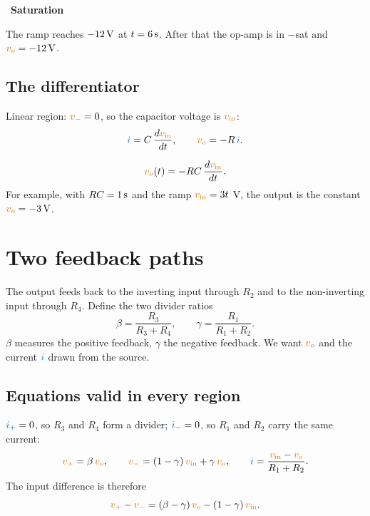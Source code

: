 \documentclass[11pt,a4paper]{article}
\newcommand{\Icol}[1]{\textcolor{ccur}{#1}}
\newcommand{\Vcol}[1]{\textcolor{cvolt}{#1}}
\newif\ifsolfirst
\newcommand{\solstep}[2]{\par\ifsolfirst\global\solfirstfalse\else\bigskip\needspace{5\baselineskip}\fi
  \noindent{\color{cpow}\bfseries Step #1.}\ {\bfseries #2}\par\nobreak\smallskip}
\newcommand{\vin}{\Vcol{v_{\mathrm{in}}}}
\newcommand{\vo}{\Vcol{v_o}}
\newcommand{\vp}{\Vcol{v_+}}
\newcommand{\vm}{\Vcol{v_-}}
\newcommand{\ip}{\Icol{i_+}}
\newcommand{\im}{\Icol{i_-}}
\newcommand{\intdiff}[1]{%
  \node[oa] (A) at (0,0) {};
  \ifnum#1=0
    \draw (A.-) -- ++(-0.4,0) coordinate (n) to[R, l_=$R$] ++(-2.0,0) coordinate (s);
    \draw (n) -- ++(0,1.3) coordinate (f) to[C, l_=$C$] (f -| A.out) -- (A.out);
    \node[pol] at ($(f)+(0.45,0.38)$) {$+$}; \node[pol] at ($(f -| A.out)+(-0.45,0.38)$) {$-$};
    \node[font=\small, text=cvolt] at ($(f)!0.5!(f -| A.out)+(0,0.45)$) {$v_C$};
    \draw[iar] ($(s)+(0.35,0.28)$) -- ++(0.5,0); \node[font=\small, text=ccur, above] at ($(s)+(0.6,0.28)$) {$i$};
  \else
    \draw (A.-) -- ++(-0.4,0) coordinate (n) to[C, l_=$C$] ++(-2.0,0) coordinate (s);
    \draw (n) -- ++(0,1.3) coordinate (f) to[R, l=$R$] (f -| A.out) -- (A.out);
    \node[pol] at ($(s)+(0.35,0.42)$) {$+$}; \node[pol] at ($(n)+(-0.35,0.42)$) {$-$};
    \draw[iar] ($(f)+(0.3,0.32)$) -- ++(0.5,0); \node[font=\small, text=ccur, above] at ($(f)+(0.55,0.32)$) {$i$};
  \fi
  \draw (s) to[american voltage source, l_=$\Vcol{v_{\mathrm{in}}}$] ($(s)+(0,-1.8)$) node[ground] {};
  \draw (A.+) -- ++(-0.4,0) -- ++(0,-0.4) node[ground] {};
  \draw (A.out) -- ++(0.8,0) node[ocirc] {} node[right, font=\small, text=cvolt] {$v_o$};
  \fill (n) circle (1.6pt); \fill (A.out) circle (1.6pt);}
\newcommand{\twoFb}[4]{%
  \node[oa] (A) at (0,0) {};
  \draw (A.-) -- ++(-0.4,0) coordinate (n) to[R, l_=#1] ++(-2.6,0) coordinate (s);
  \draw (s) to[american voltage source, l_=$\Vcol{v_{\mathrm{in}}}$] ($(s)+(0,-1.8)$) node[ground] {};
  \draw[iar] ($(s)+(0.25,0.25)$) -- ++(0.5,0); \node[font=\small, text=ccur, anchor=east] at ($(s)+(0.25,0.3)$) {$i$};
  \draw (n) -- ++(0,1.3) coordinate (f) to[R, l=#2] (f -| A.out) -- (A.out);
  \draw (A.+) -- ++(-0.4,0) coordinate (q) -- ++(0,-1.0) coordinate (b) to[R, l_=#4] (b -| A.out) -- (A.out);
  \draw (q) -- ++(-1.0,0) coordinate (g) to[R, l_=#3] ++(0,-1.6) node[ground] {};
  \draw (A.out) -- ++(0.8,0) node[ocirc] {} node[right, font=\small, text=cvolt] {$v_o$};
  \fill (n) circle (1.6pt); \fill (q) circle (1.6pt); \fill (A.out) circle (1.6pt);}
\begin{document}
\solstep{2}{Saturation}
The ramp reaches $-12\,\mathrm{V}$ at $t = 6\,\mathrm{s}$. After that the op-amp is in $-$sat and $\vo = -12\V$.

\subsection{The differentiator}

\begin{minipage}[c]{0.46\linewidth}
\centering
{}
\end{minipage}\hfill
\begin{minipage}[c]{0.5\linewidth}
Linear region: $\vm = 0$, so the capacitor voltage is $\vin$:
\[
  \Icol{i} = C\,\frac{d\vin}{dt}, \qquad \vo = -R\,\Icol{i} .
\]
\end{minipage}

\[
  \vo(t) = -RC\,\frac{d\vin}{dt} .
\]
For example, with $RC = 1\,\mathrm{s}$ and the ramp $\vin = 3t$ V, the output is the constant
$\vo = -3\V$.

\section{Two feedback paths}

\begin{minipage}[c]{0.46\linewidth}
\centering
{}
\end{minipage}\hfill
\begin{minipage}[c]{0.5\linewidth}
The output feeds back to the inverting input through $R_2$ and to the non-inverting input through
$R_4$. Define the two divider ratios
\[
  \beta = \frac{R_3}{R_3 + R_4}, \qquad \gamma = \frac{R_1}{R_1 + R_2}.
\]
$\beta$ measures the positive feedback, $\gamma$ the negative feedback. We want $\vo$ and the
current $\Icol{i}$ drawn from the source.
\end{minipage}

\subsection{Equations valid in every region}
$\ip = 0$, so $R_3$ and $R_4$ form a divider; $\im = 0$, so $R_1$ and $R_2$ carry the same current:
\[
  \vp = \beta\,\vo, \qquad
  \vm = (1 - \gamma)\,\vin + \gamma\,\vo, \qquad
  \Icol{i} = \frac{\vin - \vo}{R_1 + R_2}.
\]
The input difference is therefore
\[
  \vp - \vm = (\beta - \gamma)\,\vo - (1 - \gamma)\,\vin .
\]
\end{document}
